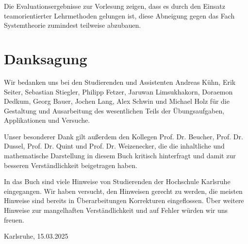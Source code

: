 Die Evaluationsergebnisse zur Vorlesung zeigen, dass es durch den Einsatz teamorientierter Lehrmethoden gelungen ist, diese Abneigung gegen das Fach Systemtheorie zumindest teilweise abzubauen.

\section{Danksagung}\label{sec:1.3}

Wir bedanken uns bei den Studierenden und Assistenten Andreas Kühn, Erik Seiter, Sebastian Stiegler, Philipp Fetzer, Jaruwan Limsukhakorn, Doraemon Dedkum, Georg Bauer, Jochen Lang, Alex Schwin und Michael Holz für die Gestaltung und Ausarbeitung des wesentlichen Teils der Übungsaufgaben, Applikationen und Versuche.

Unser besonderer Dank gilt außerdem den Kollegen Prof. Dr. Beucher, Prof. Dr. Dussel, Prof. Dr. Quint und Prof. Dr. Weizenecker, die die inhaltliche und mathematische Darstellung in diesem Buch kritisch hinterfragt und damit zur besseren Verständlichkeit beigetragen haben.

In das Buch sind viele Hinweise von Studierenden der Hochschule Karlsruhe eingegangen. Wir haben versucht, den Hinweisen gerecht zu werden, die meisten Hinweise sind bereits in Überarbeitungen Korrekturen eingeflossen. Über weitere Hinweise zur mangelhaften Verständlichkeit und auf Fehler würden wir uns freuen.

Karlsruhe, 15.03.2025
